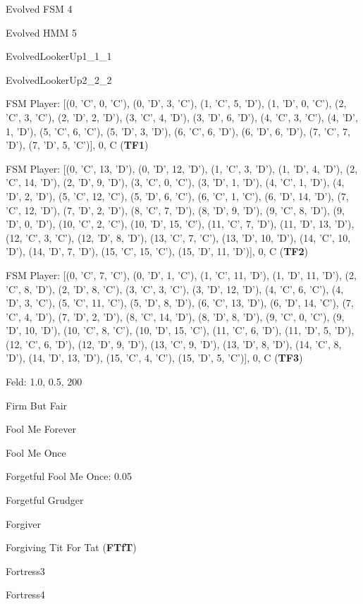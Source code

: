 \item Evolved FSM 4
\item Evolved HMM 5
\item EvolvedLookerUp1\_1\_1
\item EvolvedLookerUp2\_2\_2
\item FSM Player: [(0, 'C', 0, 'C'), (0, 'D', 3, 'C'), (1, 'C', 5, 'D'), (1, 'D', 0, 'C'), (2, 'C', 3, 'C'), (2, 'D', 2, 'D'), (3, 'C', 4, 'D'), (3, 'D', 6, 'D'), (4, 'C', 3, 'C'), (4, 'D', 1, 'D'), (5, 'C', 6, 'C'), (5, 'D', 3, 'D'), (6, 'C', 6, 'D'), (6, 'D', 6, 'D'), (7, 'C', 7, 'D'), (7, 'D', 5, 'C')], 0, C
(\textbf{TF1})\item FSM Player: [(0, 'C', 13, 'D'), (0, 'D', 12, 'D'), (1, 'C', 3, 'D'), (1, 'D', 4, 'D'), (2, 'C', 14, 'D'), (2, 'D', 9, 'D'), (3, 'C', 0, 'C'), (3, 'D', 1, 'D'), (4, 'C', 1, 'D'), (4, 'D', 2, 'D'), (5, 'C', 12, 'C'), (5, 'D', 6, 'C'), (6, 'C', 1, 'C'), (6, 'D', 14, 'D'), (7, 'C', 12, 'D'), (7, 'D', 2, 'D'), (8, 'C', 7, 'D'), (8, 'D', 9, 'D'), (9, 'C', 8, 'D'), (9, 'D', 0, 'D'), (10, 'C', 2, 'C'), (10, 'D', 15, 'C'), (11, 'C', 7, 'D'), (11, 'D', 13, 'D'), (12, 'C', 3, 'C'), (12, 'D', 8, 'D'), (13, 'C', 7, 'C'), (13, 'D', 10, 'D'), (14, 'C', 10, 'D'), (14, 'D', 7, 'D'), (15, 'C', 15, 'C'), (15, 'D', 11, 'D')], 0, C
(\textbf{TF2})\item FSM Player: [(0, 'C', 7, 'C'), (0, 'D', 1, 'C'), (1, 'C', 11, 'D'), (1, 'D', 11, 'D'), (2, 'C', 8, 'D'), (2, 'D', 8, 'C'), (3, 'C', 3, 'C'), (3, 'D', 12, 'D'), (4, 'C', 6, 'C'), (4, 'D', 3, 'C'), (5, 'C', 11, 'C'), (5, 'D', 8, 'D'), (6, 'C', 13, 'D'), (6, 'D', 14, 'C'), (7, 'C', 4, 'D'), (7, 'D', 2, 'D'), (8, 'C', 14, 'D'), (8, 'D', 8, 'D'), (9, 'C', 0, 'C'), (9, 'D', 10, 'D'), (10, 'C', 8, 'C'), (10, 'D', 15, 'C'), (11, 'C', 6, 'D'), (11, 'D', 5, 'D'), (12, 'C', 6, 'D'), (12, 'D', 9, 'D'), (13, 'C', 9, 'D'), (13, 'D', 8, 'D'), (14, 'C', 8, 'D'), (14, 'D', 13, 'D'), (15, 'C', 4, 'C'), (15, 'D', 5, 'C')], 0, C
(\textbf{TF3})\item Feld: 1.0, 0.5, 200
\item Firm But Fair
\item Fool Me Forever
\item Fool Me Once
\item Forgetful Fool Me Once: 0.05
\item Forgetful Grudger
\item Forgiver
\item Forgiving Tit For Tat
(\textbf{FTfT})\item Fortress3
\item Fortress4
